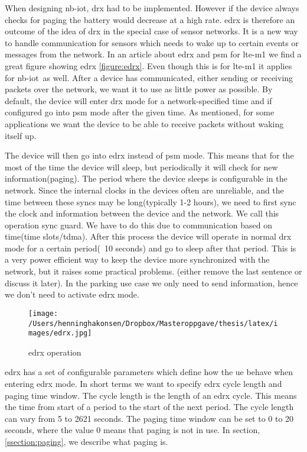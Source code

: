 \documentclass[USenglish]{ifimaster}  %
\begin{document}
When designing \acrshort{nb-iot}, \acrshort{drx} had to be implemented. However if the device always checks for paging the battery would decrease at a high rate. \acrshort{edrx} is therefore an outcome of the idea of \acrshort{drx} in the special case of sensor networks. It is a new way to handle communication for sensors which needs to wake up to certain events or messages from the network. In an article about \acrshort{edrx} and \acrshort{psm} for \acrshort{lte-m1} we find a great figure showing \acrshort{edrx} \vref{figure:edrx}. Even though this is for \acrshort{lte-m1} it applies for \acrshort{nb-iot} as well. After a device has communicated, either sending or receiving packets over the network, we want it to use as little power as possible. By default, the device will enter \acrshort{drx} mode for a network-specified time and if configured go into \acrshort{psm} mode after the given time. As mentioned, for some applications we want the device to be able to receive packets without waking itself up.

The device will then go into \acrshort{edrx} instead of \acrshort{psm} mode. This means that for the most of the time the device will sleep, but periodically it will check for new information(paging). The period where the device sleeps is configurable in the network. Since the internal clocks in the devices often are unreliable, and the time between these syncs may be long(typically 1-2 hours), we need to first sync the clock and information between the device and the network. We call this operation sync guard. We have to do this due to communication based on time(time slots/\acrlong{tdma}). After this process the device will operate in normal \acrshort{drx} mode for a certain period(~10 seconds) and go to sleep after that period. This is a very power efficient way to keep the device more synchronized with the network, but it raises some practical problems. (either remove the last sentence or discuss it later). In the parking use case we only need to send information, hence we don't need to activate \acrshort{edrx} mode.

\begin{figure}[ht]
  \centering\texttt{[image: /Users/henninghakonsen/Dropbox/Masteroppgave/thesis/latex/images/edrx.jpg]}
  \caption[\acrshort{edrx} operation]{\acrshort{edrx} operation \cite{online:edrxpsm}}
  \label{figure:edrx}
\end{figure}

\acrshort{edrx} has a set of configurable parameters which define how the \acrshort{ue} behave when entering \acrshort{edrx} mode. In short terms we want to specify \acrshort{edrx} cycle length and paging time window. The cycle length is the length of an \acrshort{edrx} cycle. This means the time from start of a period to the start of the next period. The cycle length can vary from 5 to 2621 seconds. The paging time window can be set to 0 to 20 seconds, where the value 0 means that paging is not in use. In section, \vref{ssection:paging}, we describe what paging is.
\end{document}
